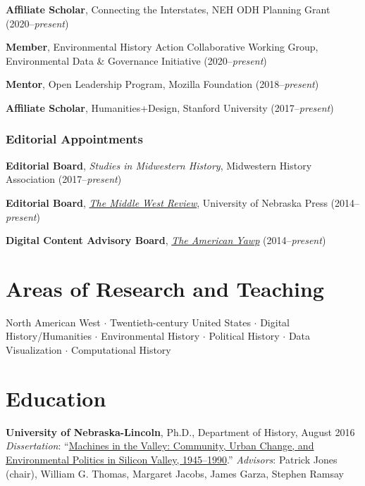\textbf{Affiliate Scholar}, Connecting the Interstates, NEH ODH Planning
Grant (2020--\emph{present})

\textbf{Member}, Environmental History Action Collaborative Working
Group, Environmental Data \& Governance Initiative
(2020--\emph{present})

\textbf{Mentor}, Open Leadership Program, Mozilla Foundation
(2018--\emph{present})

\textbf{Affiliate Scholar}, Humanities+Design, Stanford University
(2017--\emph{present})

\vspace{0.2cm}

\newpage

\subsubsection{Editorial Appointments}\label{editorial-appointments}

\textbf{Editorial Board}, \emph{Studies in Midwestern History},
Midwestern History Association (2017--\emph{present})

\textbf{Editorial Board},
\emph{\href{https://uimiddle.wordpress.com/}{The Middle West Review}},
University of Nebraska Press (2014--\emph{present})

\textbf{Digital Content Advisory Board},
\emph{\href{http://www.americanyawp.com/}{The American Yawp}}
(2014--\emph{present})

\section{Areas of Research and
Teaching}\label{areas-of-research-and-teaching}

North American West \(\cdot\) Twentieth-century United States \(\cdot\)
Digital History/Humanities \(\cdot\) Environmental History \(\cdot\)
Political History \(\cdot\) Data Visualization \(\cdot\) Computational
History

\section{Education}\label{education}

\textbf{University of Nebraska-Lincoln}, Ph.D., Department of History,
August 2016\\
\emph{Dissertation}:
``\href{http://digitalcommons.unl.edu/historydiss/86/}{Machines in the
Valley: Community, Urban Change, and Environmental Politics in Silicon
Valley, 1945--1990}.'' \emph{Advisors}: Patrick Jones (chair), William
G. Thomas, Margaret Jacobs, James Garza, Stephen Ramsay

